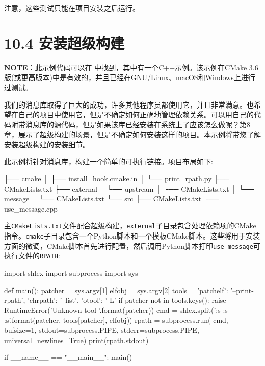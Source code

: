 注意，这些测试只能在项目安装之后运行。


\section{10.4 安装超级构建}

\begin{myInfoBox}
\textbf{NOTE}：此示例代码可以在  中找到，其中有一个C++示例。该示例在CMake 3.6版(或更高版本)中是有效的，并且已经在GNU/Linux、macOS和Windows上进行过测试。
\end{myInfoBox}

我们的消息库取得了巨大的成功，许多其他程序员都使用它，并且非常满意。也希望在自己的项目中使用它，但是不确定如何正确地管理依赖关系。可以用自己的代码附带消息库的源代码，但是如果该库已经安装在系统上了应该怎么做呢？第8章，展示了超级构建的场景，但是不确定如何安装这样的项目。本示例将带您了解安装超级构建的安装细节。


此示例将针对消息库，构建一个简单的可执行链接。项目布局如下:

\begin{codebox}[shell]
├── cmake
│    ├── install_hook.cmake.in
│    └── print_rpath.py
├── CMakeLists.txt
├── external
│    └── upstream
│        ├── CMakeLists.txt
│        └── message
│            └── CMakeLists.txt
└── src
    ├── CMakeLists.txt
    └── use_message.cpp
\end{codebox}

主\texttt{CMakeLists.txt}文件配合超级构建，\texttt{external}子目录包含处理依赖项的CMake指令。\texttt{cmake}子目录包含一个Python脚本和一个模板CMake脚本。这些将用于安装方面的微调，CMake脚本首先进行配置，然后调用Python脚本打印\texttt{use\_message}可执行文件的\texttt{RPATH}:

\begin{codebox}[python]
import shlex
import subprocess
import sys

def main():
  patcher = sys.argv[1]
  elfobj = sys.argv[2]
  tools = {'patchelf': '--print-rpath', 'chrpath': '--list', 'otool': '-L'}
  if patcher not in tools.keys():
  raise RuntimeError('Unknown tool {}'.format(patcher))
  cmd = shlex.split('{:s} {:s} {:s}'.format(patcher, tools[patcher], elfobj))
  rpath = subprocess.run(
      cmd,
      bufsize=1,
      stdout=subprocess.PIPE,
      stderr=subprocess.PIPE,
      universal_newlines=True)
  print(rpath.stdout)

if __name__ == "__main__":
  main()
\end{codebox}

